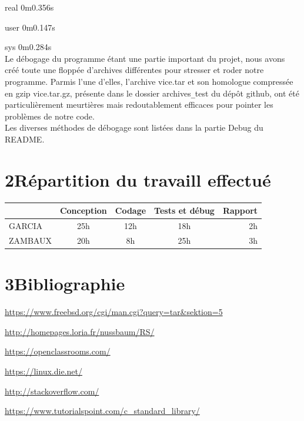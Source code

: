 \documentclass[12pt, a4paper]{report}
\begin{document}
\hspace{1.5cm}	real	0m0.356s

\hspace{1.5cm}	user	0m0.147s

\hspace{1.5cm}	sys	0m0.284s
\\
\hspace{0.5cm}Le débogage du programme étant une partie important du projet, nous avons créé toute une floppée d'archives différentes pour stresser et roder notre programme. Parmis l'une d'elles, l'archive vice.tar et son homologue compressée en gzip vice.tar.gz, présente dans le dossier archives\verb|_|test du dépôt github, ont été particulièrement meurtières mais redoutablement efficaces pour pointer les problèmes de notre code.\\

\hspace{0.5cm}Les diverses méthodes de débogage sont listées dans la partie Debug du README.

\chapter*{2\hspace{1cm}Répartition du travaill effectué}

\begin{tabular}{|l|c|c|c|r|}
  \hline
  &Conception & Codage & Tests et débug & Rapport \\
  \hline
  GARCIA & 25h & 12h & 18h & 2h\\
  ZAMBAUX & 20h & 8h & 25h & 3h\\
  \hline
\end{tabular}


\chapter*{3\hspace{1cm}Bibliographie}


\hspace{0.6cm}\url{https://www.freebsd.org/cgi/man.cgi?query=tar&sektion=5}

\url{http://homepages.loria.fr/nussbaum/RS/}

\url{https://openclassrooms.com/}

\url{https://linux.die.net/}

\url{http://stackoverflow.com/}

\url{https://www.tutorialspoint.com/c_standard_library/}
\end{document}
